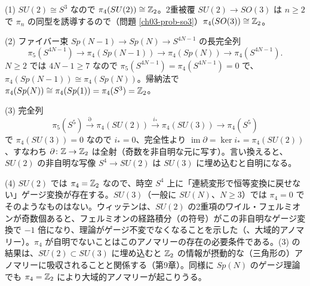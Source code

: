 \begin{solution}
(1) $SU(2)\cong S^3$ なので $\pi_4(SU(2))\cong\mathbb{Z}_2$。2重被覆 $SU(2)\to SO(3)$ は $n\ge2$ で $\pi_n$ の同型を誘導するので（問題 \ref{ch03-prob-so3}）$\pi_4(SO(3))\cong\mathbb{Z}_2$。

(2) ファイバー束 $Sp(N-1)\to Sp(N)\to S^{4N-1}$ の長完全列
\[
\pi_5(S^{4N-1})\to\pi_4(Sp(N-1))\to\pi_4(Sp(N))\to\pi_4(S^{4N-1}).
\]
$N\ge2$ では $4N-1\ge7$ なので $\pi_5(S^{4N-1})=\pi_4(S^{4N-1})=0$ で、$\pi_4(Sp(N-1))\cong\pi_4(Sp(N))$。帰納法で $\pi_4(Sp(N))\cong\pi_4(Sp(1))=\pi_4(S^3)=\mathbb{Z}_2$。

(3) 完全列
\[
\pi_5(S^5)\xrightarrow{\partial}\pi_4(SU(2))\xrightarrow{i_*}\pi_4(SU(3))\to\pi_4(S^5)
\]
で $\pi_4(SU(3))=0$ なので $i_*=0$、完全性より $\operatorname{im}\partial=\ker i_*=\pi_4(SU(2))$、すなわち $\partial\colon\mathbb{Z}\to\mathbb{Z}_2$ は全射（奇数を非自明な元に写す）。言い換えると、$SU(2)$ の非自明な写像 $S^4\to SU(2)$ は $SU(3)$ に埋め込むと自明になる。

(4) $SU(2)$ では $\pi_4=\mathbb{Z}_2$ なので、時空 $S^4$ 上に「連続変形で恒等変換に戻せない」ゲージ変換が存在する。$SU(3)$（一般に $SU(N)$、$N\ge3$）では $\pi_4=0$ でそのようなものはない。ウィッテンは、$SU(2)$ の2重項のワイル・フェルミオンが奇数個あると、フェルミオンの経路積分（の符号）がこの非自明なゲージ変換で $-1$ 倍になり、理論がゲージ不変でなくなることを示した（、大域的アノマリー）。$\pi_4$ が自明でないことはこのアノマリーの存在の必要条件である。(3) の結果は、$SU(2)\subset SU(3)$ に埋め込むと $\mathbb{Z}_2$ の情報が摂動的な（三角形の）アノマリーに吸収されることと関係する（第9章）。同様に $Sp(N)$ のゲージ理論でも $\pi_4=\mathbb{Z}_2$ により大域的アノマリーが起こりうる。
\end{solution}
